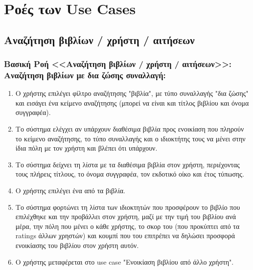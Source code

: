 \documentclass[12pt,a4paper]{article}
\begin{document}
\section{Ροές των Use Cases}
\label{Ροές των Use Cases}

\subsection{Αναζήτηση βιβλίων / χρήστη / αιτήσεων}

\subsubsection*{Βασική Ροή <<Αναζήτηση βιβλίων / χρήστη / αιτήσεων>>: Αναζήτηση βιβλίων με δια ζώσης συναλλαγή:}
\begin{enumerate}
    \item Ο χρήστης επιλέγει φίλτρο αναζήτησης "βιβλία", με τύπο συναλλαγής "δια ζώσης" και εισάγει ένα κείμενο αναζήτησης (μπορεί να είναι και τίτλος βιβλίου και όνομα συγγραφέα).
        \label{Επιλογή τύπου αναζήτησης}
    \item Το σύστημα ελέγχει αν υπάρχουν διαθέσιμα βιβλία προς ενοικίαση που πληρούν το κείμενο αναζήτησης, το τύπο συναλλαγής και ο ιδιοκτήτης τους να μένει στην ίδια πόλη με τον χρήστη και βλέπει ότι υπάρχουν.
        \label{Ύπαρξη βιβλίου}
    \item Το σύστημα δείχνει τη λίστα με τα διαθέσιμα βιβλία στον χρήστη, περιέχοντας τους πλήρεις τίτλους, το όνομα συγγραφέα, τον εκδοτικό οίκο και έτος τύπωσης.
    \item Ο χρήστης επιλέγει ένα από τα βιβλία.
    \item Το σύστημα φορτώνει τη λίστα των ιδιοκτητών που προσφέρουν το βιβλίο που επιλέχθηκε και την προβάλλει στον χρήστη, μαζί με την τιμή του βιβλίου ανά μέρα, την πόλη που μένει ο κάθε χρήστης, το σκορ του (που προκύπτει από τα ratings άλλων χρηστών) και κουμπί που του επιτρέπει να δηλώσει προσφορά ενοικίασης του βιβλίου στον χρήστη αυτόν.
    \item Ο χρήστης μεταφέρεται στο use case "Ενοικίαση βιβλίου από άλλο χρήστη".
\end{enumerate}
\end{document}
